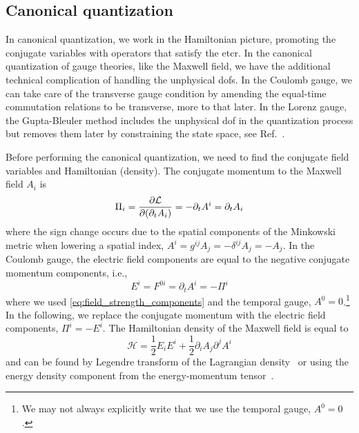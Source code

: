 \subsection{Canonical quantization}

In canonical quantization, we work in the Hamiltonian picture, promoting the conjugate variables with operators that satisfy the \gls{etcr}.
In the canonical quantization of gauge theories, like the Maxwell field, we have the additional technical complication of handling the unphysical \gls{dof}s.
In the Coulomb gauge, we can take care of the transverse gauge condition by amending the equal-time commutation relations to be transverse, more to that later.
In the Lorenz gauge, the Gupta-Bleuler method includes the unphysical \gls{dof} in the quantization process but removes them later by constraining the state space, see Ref.~\cite[p.~180]{Greiner2013}.

Before performing the canonical quantization, we need to find the conjugate field variables and Hamiltonian (density).
The conjugate momentum to the Maxwell field $A_i$ is~\cite[p.~342]{Srednicki2007}
\begin{equation}
	\Pi_i
	=
	\pdv{\mathcal{L}}{(\partial_t A_i)}
	=
	-
	\partial_t A^i
	=
	\partial_t A_i
	\label{eq:maxwell_conjugate_momentum}
\end{equation}
where the sign change occurs due to the spatial components of the Minkowski metric when lowering a spatial index, $A^i=g^{ij}A_j=-\delta^{ij}A_j=-A_j$.
In the Coulomb gauge, the electric field components are equal to the negative conjugate momentum components, i.e.,
\begin{equation}
	E^i
	=
	F^{0i}
	=
	\partial_t A^i
	=
	-
	\Pi^i
\end{equation}
where we used \cref{eq:field_strength_components} and the temporal gauge, $A^0=0$.\footnote{We may not always explicitly write that we use the temporal gauge, $A^0=0$.}
In the following, we replace the conjugate momentum with the electric field components, $\Pi^i=-E^i$.
The Hamiltonian density of the Maxwell field is equal to
\begin{equation}
	\mathcal{H}
	=
	\frac{1}{2}
	E_i E^i
	+
	\frac{1}{2}
	\partial_i A_j
	\partial^j A^i
	\label{eq:maxwell_hamiltonian}
\end{equation}
and can be found by Legendre transform of the Lagrangian density~\cite[p.~342]{Srednicki2007} or using the energy density component from the energy-momentum tensor~\cite[p.~148]{Greiner2013}.

